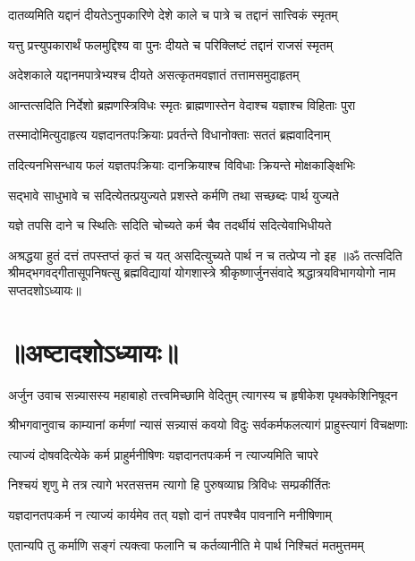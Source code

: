 \twolineshloka
{दातव्यमिति यद्दानं दीयतेऽनुपकारिणे}
{देशे काले च पात्रे च तद्दानं सात्त्विकं स्मृतम्}%

\twolineshloka
{यत्तु प्रत्त्युपकारार्थं फलमुद्दिश्य वा पुनः}
{दीयते च परिक्लिष्टं तद्दानं राजसं स्मृतम्}%

\twolineshloka
{अदेशकाले यद्दानमपात्रेभ्यश्च दीयते}
{असत्कृतमवज्ञातं तत्तामसमुदाहृतम्}%

\twolineshloka
{आन्तत्सदिति निर्देशो ब्रह्मणस्त्रिविधः स्मृतः}
{ब्राह्मणास्तेन वेदाश्च यज्ञाश्च विहिताः पुरा}%

\twolineshloka
{तस्मादोमित्युदाहृत्य यज्ञदानतपःक्रियाः}
{प्रवर्तन्ते विधानोक्ताः सततं ब्रह्मवादिनाम्}%

\twolineshloka
{तदित्यनभिसन्धाय फलं यज्ञतपःक्रियाः}
{दानक्रियाश्च विविधाः क्रियन्ते मोक्षकाङ्क्षिभिः}%

\twolineshloka
{सद्भावे साधुभावे च सदित्येतत्प्रयुज्यते}
{प्रशस्ते कर्मणि तथा सच्छब्दः पार्थ युज्यते}%

\twolineshloka
{यज्ञे तपसि दाने च स्थितिः सदिति चोच्यते}
{कर्म चैव तदर्थीयं सदित्येवाभिधीयते}%

\twolineshloka
{अश्रद्धया हुतं दत्तं तपस्तप्तं कृतं च यत्}
{असदित्युच्यते पार्थ न च तत्प्रेप्य नो इह}%
{॥ॐ तत्सदिति श्रीमद्भगवद्गीतासूपनिषत्सु ब्रह्मविद्यायां योगशास्त्रे श्रीकृष्णार्जुनसंवादे श्रद्धात्रयविभागयोगो नाम सप्तदशोऽध्यायः॥}

\section{॥अष्टादशोऽध्यायः॥}
{अर्जुन उवाच}
\twolineshloka
{सन्न्यासस्य महाबाहो तत्त्वमिच्छामि वेदितुम्}
{त्यागस्य च हृषीकेश पृथक्केशिनिषूदन}%

{श्रीभगवानुवाच}
\twolineshloka
{काम्यानां कर्मणां न्यासं सन्न्यासं कवयो विदुः}
{सर्वकर्मफलत्यागं प्राहुस्त्यागं विचक्षणाः}%

\twolineshloka
{त्याज्यं दोषवदित्येके कर्म प्राहुर्मनीषिणः}
{यज्ञदानतपःकर्म न त्याज्यमिति चापरे}%

\twolineshloka
{निश्चयं शृणु मे तत्र त्यागे भरतसत्तम}
{त्यागो हि पुरुषव्याघ्र त्रिविधः सम्प्रकीर्तितः}%

\twolineshloka
{यज्ञदानतपःकर्म न त्याज्यं कार्यमेव तत्}
{यज्ञो दानं तपश्चैव पावनानि मनीषिणाम्}%

\twolineshloka
{एतान्यपि तु कर्माणि सङ्गं त्यक्त्वा फलानि च}
{कर्तव्यानीति मे पार्थ निश्चितं मतमुत्तमम्}%

